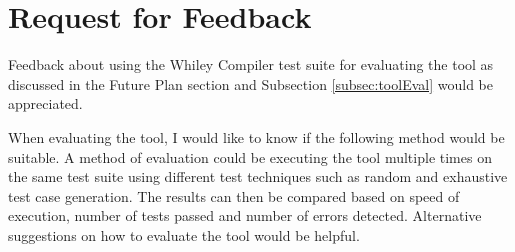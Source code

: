 \section{Request for Feedback}\label{section:feedback}


Feedback about using the Whiley Compiler test suite for evaluating the tool as discussed in the Future Plan section and Subsection \ref{subsec:toolEval} would be appreciated. 

When evaluating the tool, I would like to know if the following method would be suitable. A method of evaluation could be executing the tool multiple times on the same test suite using different test techniques such as random and exhaustive test case generation. 
The results can then be compared based on speed of execution, number of tests passed and number of errors detected. 
Alternative suggestions on how to evaluate the tool would be helpful.